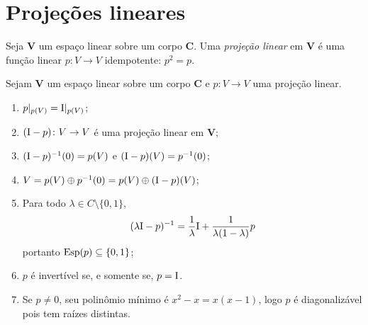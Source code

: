 \section{Projeções lineares}

\begin{definition}
Seja $\bm V$ um espaço linear sobre um corpo $\bm C$. Uma \emph{projeção linear} em $\bm V$ é uma função linear $p\colon V \to V$ idempotente: $p^2=p$.
\end{definition}

\begin{proposition}
Sejam $\bm V$ um espaço linear sobre um corpo $\bm C$ e $p\colon V \to V$ uma projeção linear.
	\begin{enumerate}
	\item $p|_{p(V)} = \mathrm{I}|_{p(V)}$;
	
	\item $(\mathrm{I}-p) \colon V \to V$ é uma projeção linear em $\bm V$;
	
	\item $(\mathrm{I}-p)^{-1}(0) = p(V)$ e $(\mathrm{I}-p)(V) = p^{-1}(0)$;
	
	\item $V = p(V) \oplus p^{-1}(0) = p(V) \oplus (\mathrm{I}-p)(V)$;
	
	\item Para todo $\lambda \in C \setminus \{0,1\}$,
		\begin{equation*}
		(\lambda\mathrm{I}-p)^{-1} = \frac{1}{\lambda}\mathrm{I} + \frac{1}{\lambda(1-\lambda)}p
		\end{equation*}
portanto $\operatorname{Esp}(p) \subseteq \{0,1\}$;

	\item $p$ é invertível se, e somente se, $p=\mathrm{I}$.

	\item Se $p \neq 0$, seu polinômio mínimo é $x^2-x = x(x-1)$, logo $p$ é diagonalizável pois tem raízes distintas.
	\end{enumerate}
\end{proposition}
